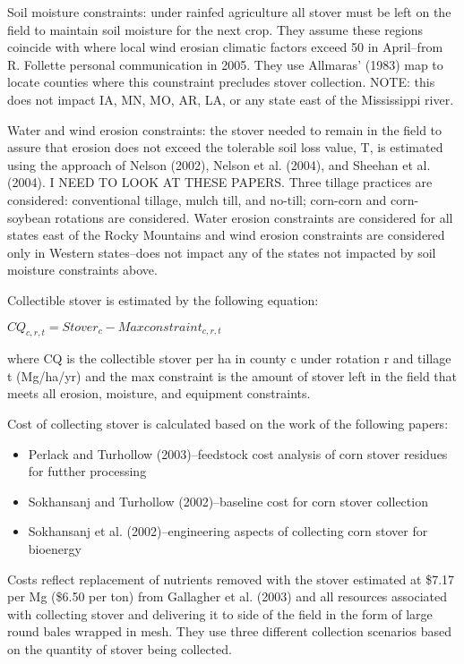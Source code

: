 \documentclass{article}\usepackage[]{graphicx}\usepackage[]{color}
\begin{document}
Soil moisture constraints: under rainfed agriculture all stover must be left on the field to maintain soil moisture for the next crop.  They assume these regions coincide with where local wind erosian climatic factors exceed 50 in April--from R. Follette personal communication in 2005.  They use Allmaras' (1983) map to locate counties where this counstraint precludes stover collection.  NOTE: this does not impact IA, MN, MO, AR, LA, or any state east of the Mississippi river.

Water and wind erosion constraints: the stover needed to remain in the field to assure that erosion does not exceed the tolerable soil loss value, T, is estimated using the approach of Nelson (2002), Nelson et al. (2004), and Sheehan et al. (2004). I NEED TO LOOK AT THESE PAPERS.  Three tillage practices are considered: conventional tillage, mulch till, and no-till; corn-corn and corn-soybean rotations are considered.  Water erosion constraints are considered for all states east of the Rocky Mountains and wind erosion constraints are considered only in Western states--does not impact any of the states not impacted by soil moisture constraints above.

Collectible stover is estimated by the following equation: \\

\begin{centering}
$CQ_{c,r,t} = Stover_c - Max constraint_{c,r,t}$
\end{centering}

where CQ is the collectible stover per ha in county c under rotation r and tillage t (Mg/ha/yr) and the max constraint is the amount of stover left in the field that meets all erosion, moisture, and equipment constraints.

Cost of collecting stover is calculated based on the work of the following papers: \\

\begin{itemize}
\item Perlack and Turhollow (2003)--feedstock cost analysis of corn stover residues for futther processing
\item Sokhansanj and Turhollow (2002)--baseline cost for corn stover collection
\item Sokhansanj et al. (2002)--engineering aspects of collecting corn stover for bioenergy
\end{itemize}

Costs reflect replacement of nutrients removed with the stover estimated at \$7.17 per Mg (\$6.50 per ton) from Gallagher et al. (2003) and all resources associated with collecting stover and delivering it to side of the field in the form of large round bales wrapped in mesh.  They use three different collection scenarios based on the quantity of stover being collected.
\end{document}
